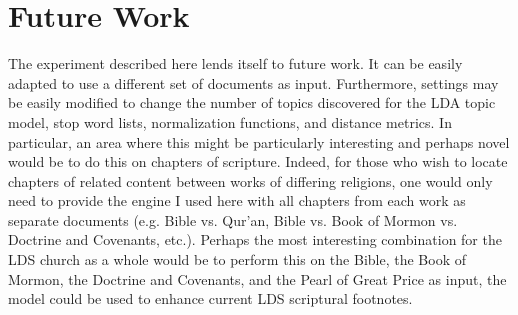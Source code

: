 
\section{Future Work}
The experiment described here lends itself to future work. It can be easily adapted to use a different set of documents as input. Furthermore, settings may be easily modified to change the number of topics discovered for the LDA topic model, stop word lists, normalization functions, and distance metrics. In particular, an area where this might be particularly interesting and perhaps novel would be to do this on chapters of scripture. Indeed, for those who wish to locate chapters of related content between works of differing religions, one would only need to provide the engine I used here with all chapters from each work as separate documents (e.g. Bible vs. Qur'an, Bible vs. Book of Mormon vs. Doctrine and Covenants, etc.). Perhaps the most interesting combination for the LDS church as a whole would be to perform this on the Bible, the Book of Mormon, the Doctrine and Covenants, and the Pearl of Great Price as input, the model could be used to enhance current LDS scriptural footnotes.
